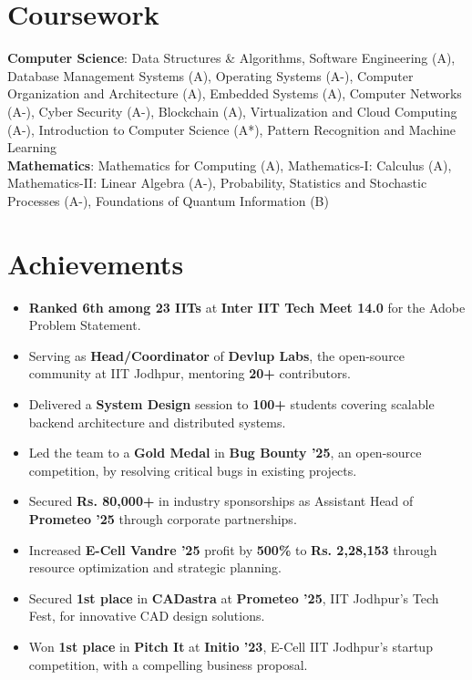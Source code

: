 \documentclass[letterpaper,10pt]{article}
\newcommand{\resumeItem}[1]{
  \item\small{
    {#1 \vspace{-1mm}}
  }
}
\newcommand{\resumeItemListStart}{\begin{itemize}}
\newcommand{\resumeItemListEnd}{\end{itemize}\vspace{-5pt}}
\begin{document}
\section{Coursework}
 \begin{itemize}[leftmargin=0.15in, label={}]
    \small{\item{
     \textbf{Computer Science}{: Data Structures \& Algorithms, Software Engineering (A), Database Management Systems (A), Operating Systems (A-), Computer Organization and Architecture (A), Embedded Systems (A), Computer Networks (A-), Cyber Security (A-), Blockchain (A), Virtualization and Cloud Computing (A-), Introduction to Computer Science (A*), Pattern Recognition and Machine Learning} \\
     \textbf{Mathematics}{: Mathematics for Computing (A), Mathematics-I: Calculus (A), Mathematics-II: Linear Algebra (A-), Probability, Statistics and Stochastic Processes (A-), Foundations of Quantum Information (B)}
    }}
    \vspace{-1.5mm}
 \end{itemize}

\section{Achievements}
 \resumeItemListStart
    \resumeItem{\textbf{Ranked 6th among 23 IITs} at \textbf{Inter IIT Tech Meet 14.0} for the Adobe Problem Statement.}
    \resumeItem{Serving as \textbf{Head/Coordinator} of \textbf{Devlup Labs}, the open-source community at IIT Jodhpur, mentoring \textbf{20+} contributors.}
    \resumeItem{Delivered a \textbf{System Design} session to \textbf{100+} students covering scalable backend architecture and distributed systems.}
    \resumeItem{Led the team to a \textbf{Gold Medal} in \textbf{Bug Bounty '25}, an open-source competition, by resolving critical bugs in existing projects.}
    \resumeItem{Secured \textbf{Rs. 80,000+} in industry sponsorships as Assistant Head of \textbf{Prometeo '25} through corporate partnerships.}
    \resumeItem{Increased \textbf{E-Cell Vandre '25} profit by \textbf{500\%} to \textbf{Rs. 2,28,153} through resource optimization and strategic planning.}
    \resumeItem{Secured \textbf{1st place} in \textbf{CADastra} at \textbf{Prometeo '25}, IIT Jodhpur's Tech Fest, for innovative CAD design solutions.}
    \resumeItem{Won \textbf{1st place} in \textbf{Pitch It} at \textbf{Initio '23}, E-Cell IIT Jodhpur's startup competition, with a compelling business proposal.}
 \resumeItemListEnd
\end{document}

